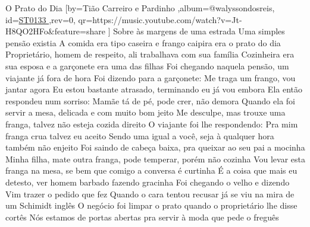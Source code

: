 \beginsong
{O Prato do Dia %
}[by={Tião Carreiro e Pardinho %
},album={@walyssondosreis},
id={\href{https://music.youtube.com/watch?v=Jt-H8QO2HFo&feature=share %
}{ST0133 %
}},rev={0}, %
qr={https://music.youtube.com/watch?v=Jt-H8QO2HFo&feature=share %
}]
\beginverse
Sobre às margens de uma estrada
Uma simples pensão existia
A comida era tipo caseira e frango caipira era o prato do dia
Proprietário, homem de respeito, ali trabalhava com sua família
Cozinheira era sua esposa e a garçonete era uma das filhas
\endverse
\beginverse
Foi chegando naquela pensão, um viajante já fora de hora
Foi dizendo para a garçonete: Me traga um frango, vou jantar agora
Eu estou bastante atrasado, terminando eu já vou embora
Ela então respondeu num sorriso: Mamãe tá de pé, pode crer, não demora
\endverse
\beginverse
Quando ela foi servir a mesa, delicada e com muito bom jeito
Me desculpe, mas trouxe uma franga, talvez não esteja cozida direito
O viajante foi lhe respondendo: Pra mim franga crua talvez eu aceito
Sendo uma igual a você, seja à qualquer hora também não enjeito
\endverse
\beginverse
Foi saindo de cabeça baixa, pra queixar ao seu pai a mocinha
Minha filha, mate outra franga, pode temperar, porém não cozinha
Vou levar esta franga na mesa, se bem que comigo a conversa é curtinha
É a coisa que mais eu detesto, ver homem barbado fazendo gracinha
\endverse
\beginverse
Foi chegando o velho e dizendo
Vim trazer o pedido que fez
Quando o cara tentou recusar já se viu na mira de um Schimidt inglês
O negócio foi limpar o prato quando o proprietário lhe disse cortês
Nós estamos de portas abertas pra servir à moda que pede o freguês
\endverse

